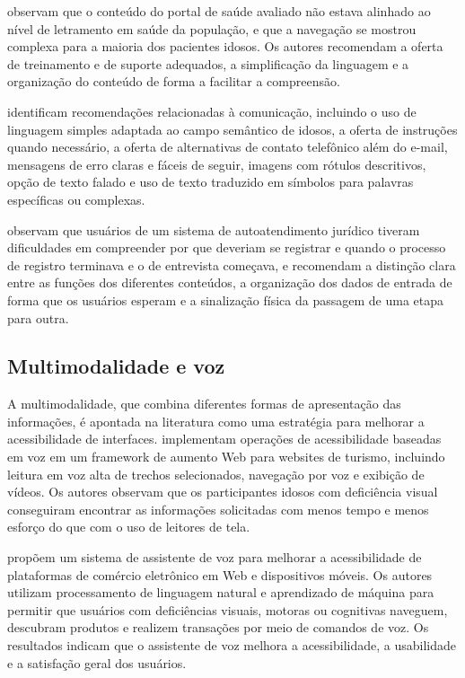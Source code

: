 \cite{barron2013feasibility} observam que o conteúdo do portal de saúde avaliado não estava alinhado ao nível de letramento em saúde da população, e que a navegação se mostrou complexa para a maioria dos pacientes idosos. Os autores recomendam a oferta de treinamento e de suporte adequados, a simplificação da linguagem e a organização do conteúdo de forma a facilitar a compreensão.

\cite{dombrovskaia2021guideline} identificam recomendações relacionadas à comunicação, incluindo o uso de linguagem simples adaptada ao campo semântico de idosos, a oferta de instruções quando necessário, a oferta de alternativas de contato telefônico além do e-mail, mensagens de erro claras e fáceis de seguir, imagens com rótulos descritivos, opção de texto falado e uso de texto traduzido em símbolos para palavras específicas ou complexas.

\cite{mastarone2007access} observam que usuários de um sistema de autoatendimento jurídico tiveram dificuldades em compreender por que deveriam se registrar e quando o processo de registro terminava e o de entrevista começava, e recomendam a distinção clara entre as funções dos diferentes conteúdos, a organização dos dados de entrada de forma que os usuários esperam e a sinalização física da passagem de uma etapa para outra.

\subsection{Multimodalidade e voz}

\label{sec:multimodalidade}

A multimodalidade, que combina diferentes formas de apresentação das informações, é apontada na literatura como uma estratégia para melhorar a acessibilidade de interfaces. \cite{gonzalez2025augmenting} implementam operações de acessibilidade baseadas em voz em um framework de aumento Web para websites de turismo, incluindo leitura em voz alta de trechos selecionados, navegação por voz e exibição de vídeos. Os autores observam que os participantes idosos com deficiência visual conseguiram encontrar as informações solicitadas com menos tempo e menos esforço do que com o uso de leitores de tela.

\cite{ramineni2024enhancing} propõem um sistema de assistente de voz para melhorar a acessibilidade de plataformas de comércio eletrônico em Web e dispositivos móveis. Os autores utilizam processamento de linguagem natural e aprendizado de máquina para permitir que usuários com deficiências visuais, motoras ou cognitivas naveguem, descubram produtos e realizem transações por meio de comandos de voz. Os resultados indicam que o assistente de voz melhora a acessibilidade, a usabilidade e a satisfação geral dos usuários.

